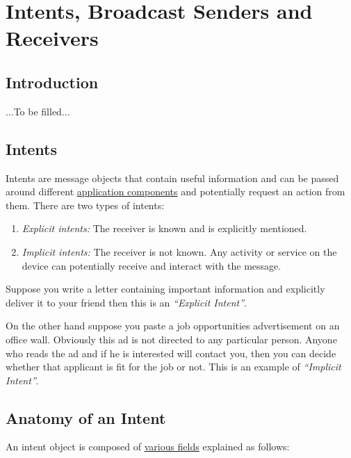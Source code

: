 \chapter{Intents, Broadcast Senders and Receivers}
\label{IBSR:intents}

\section{Introduction}
...To be filled...

\section{Intents}
\label{ALI:intents}

Intents are message objects that contain useful information and can be passed around different \href{https://developer.android.com/guide/components/fundamentals.html#Components}{application components} and potentially request an action from them. There are two types of intents:

\begin{enumerate}
	\item \textit{Explicit intents:} The receiver is known and is explicitly mentioned.
	\item \textit{Implicit intents:} The receiver is not known. Any activity or service on the device can potentially receive and interact with the message.
\end{enumerate}

Suppose you write a letter containing important information and explicitly deliver it to your friend then this is an \textit{``Explicit Intent''}. 

On the other hand suppose you paste a job opportunities advertisement on an office wall. Obviously this ad is not directed to any particular person. Anyone who reads the ad and if he is interested will contact you, then you can decide whether that applicant is fit for the job or not. This is an example of \textit{``Implicit Intent''}.

\section{Anatomy of an Intent}
\label{ALI:anatomyOfIntent}
An intent object is composed of \href{https://developer.android.com/guide/components/intents-filters.html#Building}{various fields} explained as follows:

